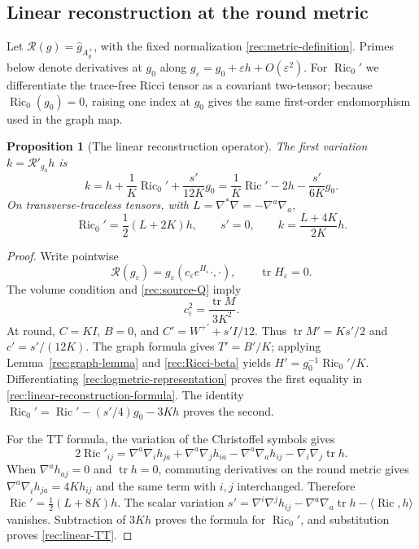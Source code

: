 \documentclass[11pt]{article}
\numberwithin{equation}{section}
\newtheorem{proposition}[theorem]{Proposition}
\theoremstyle{definition}
\theoremstyle{remark}
\DeclareMathOperator{\Ric}{Ric}
\begin{document}
\subsection{Linear reconstruction at the round metric}

Let $\mathscr R(g)=\widehat g_{A_g^+}$, with the fixed normalization
\eqref{rec:metric-definition}.  Primes below denote derivatives at
$g_0$ along $g_\varepsilon=g_0+\varepsilon h+O(\varepsilon^2)$.
For $\Ric_0'$ we differentiate the trace-free Ricci tensor as a
covariant two-tensor; because $\Ric_0(g_0)=0$, raising one index at
$g_0$ gives the same first-order endomorphism used in the graph map.

\begin{proposition}[The linear reconstruction operator]
\label{rec:linear-reconstruction}
The first variation $k=\mathscr R'_{g_0}h$ is
\begin{equation}
 k=h+\frac1K\Ric_0'+\frac{s'}{12K}g_0
   =\frac1K\Ric'-2h-\frac{s'}{6K}g_0.
 \label{rec:linear-reconstruction-formula}
\end{equation}
On transverse-traceless tensors, with
$L=\nabla^*\nabla=-\nabla^a\nabla_a$,
\begin{equation}
 \Ric_0'=\frac12(L+2K)h,\qquad s'=0,\qquad
 k=\frac{L+4K}{2K}h.
 \label{rec:linear-TT}
\end{equation}
\end{proposition}

\begin{proof}
Write pointwise
\begin{equation}
 \mathscr R(g_\varepsilon)
    =g_\varepsilon(c_\varepsilon e^{H_\varepsilon}\cdot,\cdot),
 \qquad \operatorname{tr}H_\varepsilon=0.
 \label{rec:logmetric-representation}
\end{equation}
The volume condition and \eqref{rec:source-Q} imply
\begin{equation}
 c_\varepsilon^2=\frac{\operatorname{tr}M}{3K^2}.
 \label{rec:scale-c}
\end{equation}
At round, $C=KI$, $B=0$, and $C'=W^{+\prime}+s'I/12$.
Thus $\operatorname{tr}M'=Ks'/2$ and $c'=s'/(12K)$.
The graph formula gives $T'=B'/K$; applying
Lemma~\ref{rec:graph-lemma} and \eqref{rec:Ricci-beta} yields
$H'=g_0^{-1}\Ric_0'/K$.  Differentiating
\eqref{rec:logmetric-representation} proves the first equality in
\eqref{rec:linear-reconstruction-formula}.  The identity
$\Ric_0'=\Ric'-(s'/4)g_0-3Kh$ proves the second.

For the TT formula, the variation of the Christoffel symbols gives
\[
 2\Ric'_{ij}=
 \nabla^a\nabla_i h_{ja}+\nabla^a\nabla_j h_{ia}
             -\nabla^a\nabla_a h_{ij}
             -\nabla_i\nabla_j\operatorname{tr}h.
\]
When $\nabla^a h_{aj}=0$ and $\operatorname{tr}h=0$, commuting
derivatives on the round metric gives
$\nabla^a\nabla_i h_{ja}=4Kh_{ij}$ and the same term with $i,j$
interchanged.  Therefore $\Ric'=\tfrac12(L+8K)h$.
The scalar variation
$s'=\nabla^i\nabla^j h_{ij}-\nabla^a\nabla_a\operatorname{tr}h
      -\langle\Ric,h\rangle$
vanishes.  Subtraction of $3Kh$ proves the formula for $\Ric_0'$,
and substitution proves \eqref{rec:linear-TT}.
\end{proof}
\end{document}
